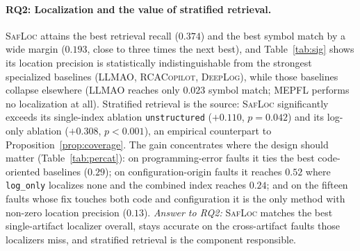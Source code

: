 \documentclass[runningheads]{llncs}
\begin{document}
\paragraph{RQ2: Localization and the value of stratified retrieval.} \textsc{SafLoc} attains the best retrieval recall ($0.374$) and the best symbol match by a wide margin ($0.193$, close to three times the next best), and Table~\ref{tab:sig} shows its location precision is statistically indistinguishable from the strongest specialized baselines (\textsc{LLMAO}, \textsc{RCACopilot}, \textsc{DeepLog}), while those baselines collapse elsewhere (\textsc{LLMAO} reaches only $0.023$ symbol match; \textsc{MEPFL} performs no localization at all). Stratified retrieval is the source: \textsc{SafLoc} significantly exceeds its single-index ablation \texttt{unstructured} ($+0.110$, $p=0.042$) and its log-only ablation ($+0.308$, $p<0.001$), an empirical counterpart to Proposition~\ref{prop:coverage}. The gain concentrates where the design should matter (Table~\ref{tab:percat}): on programming-error faults it ties the best code-oriented baselines ($0.29$); on configuration-origin faults it reaches $0.52$ where \texttt{log\_only} localizes none and the combined index reaches $0.24$; and on the fifteen faults whose fix touches both code and configuration it is the only method with non-zero location precision ($0.13$). \emph{Answer to RQ2:} \textsc{SafLoc} matches the best single-artifact localizer overall, stays accurate on the cross-artifact faults those localizers miss, and stratified retrieval is the component responsible.
\end{document}
